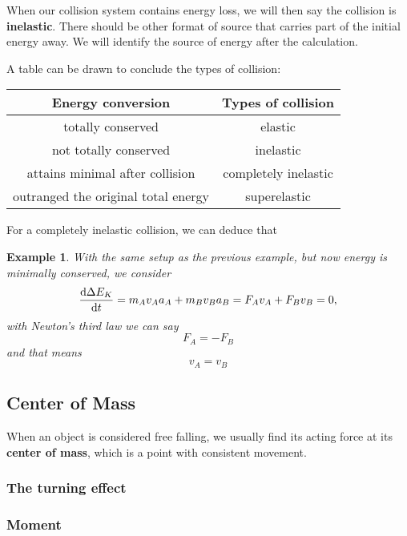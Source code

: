 \documentclass[12pt]{article}
\newtheorem*{example}{Example}
\begin{document}
    When our collision system contains energy loss, we will then say the collision is \textbf{inelastic}. There should be other format of source that carries part of the initial energy away. We will identify the source of energy after the calculation.

    A table can be drawn to conclude the types of collision:

    \begin{center}
        \begin{tabular}{|c|c|}
            \hline
            Energy conversion&Types of collision\\
            \hline
            totally conserved&elastic\\
            \hline
            not totally conserved&inelastic\\
            \hline
            attains minimal after collision&completely inelastic\\
            \hline
            outranged the original total energy&superelastic\\
            \hline
        \end{tabular}
    \end{center}

    For a completely inelastic collision, we can deduce that

    \begin{example}
        With the same setup as the previous example, but now energy is minimally conserved, we consider \[\derivative{\Delta E_K}{t}=m_A v_A a_A+m_B v_B a_B = F_A v_A + F_B v_B = 0,\] with Newton's third law we can say \[F_A = -F_B\] and that means \[v_A = v_B\]
    \end{example}

    \subsection{Center of Mass}

    When an object is considered free falling, we usually find its acting force at its \textbf{center of mass}, which is a point with consistent movement.

    \subsubsection*{The turning effect}

    \subsubsection*{Moment}
\end{document}
